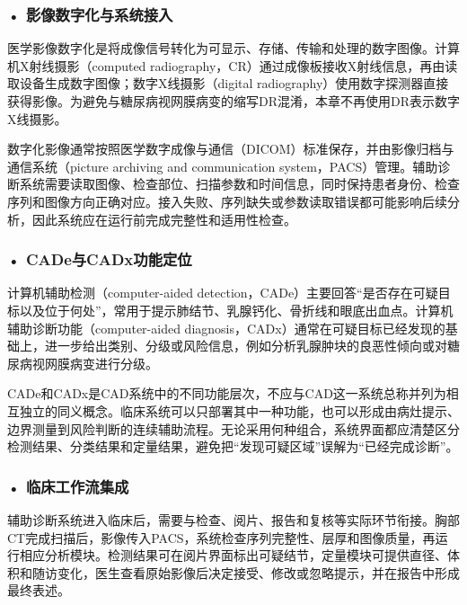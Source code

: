 \par
\noindent\begin{minipage}{\textwidth}
\centering
{}
\label{fig:ch9_13}
\end{minipage}
\par

\subsubsection*{\textbf{• 影像数字化与系统接入}}

医学影像数字化是将成像信号转化为可显示、存储、传输和处理的数字图像。计算机X射线摄影（computed radiography，CR）通过成像板接收X射线信息，再由读取设备生成数字图像；数字X线摄影（digital radiography）使用数字探测器直接获得影像。为避免与糖尿病视网膜病变的缩写DR混淆，本章不再使用DR表示数字X线摄影。

数字化影像通常按照医学数字成像与通信（DICOM）标准保存，并由影像归档与通信系统（picture archiving and communication system，PACS）管理。辅助诊断系统需要读取图像、检查部位、扫描参数和时间信息，同时保持患者身份、检查序列和图像方向正确对应。接入失败、序列缺失或参数读取错误都可能影响后续分析，因此系统应在运行前完成完整性和适用性检查。

\subsubsection*{\textbf{• CADe与CADx功能定位}}

计算机辅助检测（computer-aided detection，CADe）主要回答“是否存在可疑目标以及位于何处”，常用于提示肺结节、乳腺钙化、骨折线和眼底出血点。计算机辅助诊断功能（computer-aided diagnosis，CADx）通常在可疑目标已经发现的基础上，进一步给出类别、分级或风险信息，例如分析乳腺肿块的良恶性倾向或对糖尿病视网膜病变进行分级。

CADe和CADx是CAD系统中的不同功能层次，不应与CAD这一系统总称并列为相互独立的同义概念。临床系统可以只部署其中一种功能，也可以形成由病灶提示、边界测量到风险判断的连续辅助流程。无论采用何种组合，系统界面都应清楚区分检测结果、分类结果和定量结果，避免把“发现可疑区域”误解为“已经完成诊断”。

\subsubsection*{\textbf{• 临床工作流集成}}

辅助诊断系统进入临床后，需要与检查、阅片、报告和复核等实际环节衔接。胸部CT完成扫描后，影像传入PACS，系统检查序列完整性、层厚和图像质量，再运行相应分析模块。检测结果可在阅片界面标出可疑结节，定量模块可提供直径、体积和随访变化，医生查看原始影像后决定接受、修改或忽略提示，并在报告中形成最终表述。

